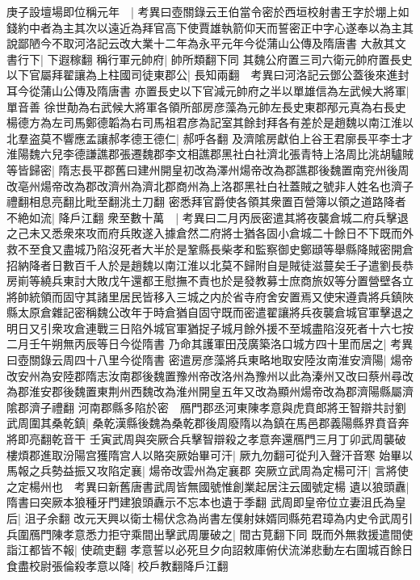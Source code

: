 庚子設壇場即位稱元年　|{
	考異曰壺關錄云王伯當令密於西垣校射書王字於堋上如錢約中者為主其次以遠近為拜官高下使賈雄執箭仰天而誓密正中字心遂奉以為主其說鄙陋今不取河洛記云改大業十二年為永平元年今從蒲山公傳及隋唐書}
大赦其文書行下|{
	下遐稼翻}
稱行軍元帥府|{
	帥所類翻下同}
其魏公府置三司六衛元帥府置長史以下官屬拜翟讓為上柱國司徒東郡公|{
	長知兩翻　考異曰河洛記云鄧公蓋後來進封耳今從蒲山公傳及隋唐書}
亦置長史以下官減元帥府之半以單雄信為左武候大將軍|{
	單音善}
徐世勣為右武候大將軍各領所部房彦藻為元帥左長史東郡邴元真為右長史楊德方為左司馬鄭德韜為右司馬祖君彦為記室其餘封拜各有差於是趙魏以南江淮以北羣盗莫不響應孟讓郝孝德王德仁|{
	郝呼各翻}
及濟隂房獻伯上谷王君廓長平李士才淮陽魏六兒李德謙譙郡張遷魏郡李文相譙郡黑社白社濟北張青特上洛周比洮胡驢賊等皆歸密|{
	隋志長平郡舊曰建州開皇初改為澤州煬帝改為郡譙郡後魏置南兖州後周改亳州煬帝改為郡改濟州為濟北郡商州為上洛郡黑社白社蓋賊之號非人姓名也濟子禮翻相息亮翻比毗至翻洮土刀翻}
密悉拜官爵使各領其衆置百營簿以領之道路降者不絶如流|{
	降戶江翻}
衆至數十萬　|{
	考異曰二月丙辰密遣其將夜襲倉城二府兵擊退之己未又悉衆來攻而府兵敗遂入據倉然二府將士猶各固小倉城二十餘日不下既而外救不至食又盡城乃陷沒死者大半於是鞏縣長柴孝和監察御史鄭頲等舉縣降賊密開倉招納降者日數百千人於是趙魏以南江淮以北莫不歸附自是賊徒滋蔓矣壬子遣劉長恭房崱等繞兵東討大敗戊午還都王慰撫不責也於是發教募士庶商旅奴等分置營壁各立將帥統領而固守其諸里居民皆移入三城之内於省寺府舍安置焉又使宋遵貴將兵鎮陜縣太原倉雜記密稱魏公改年于時倉猶自固守既而密遣翟讓將兵夜襲倉城官軍擊退之明日又引衆攻倉連戰三日陷外城官軍猶捉子城月餘外援不至城盡陷沒死者十六七按二月壬午朔無丙辰等日今從隋書}
乃命其護軍田茂廣築洛口城方四十里而居之|{
	考異曰壺關錄云周四十八里今從隋書}
密遣房彦藻將兵東略地取安陸汝南淮安濟陽|{
	煬帝改安州為安陸郡隋志汝南郡後魏置豫州帝改洛州為豫州以此為溱州又改曰蔡州尋改為郡淮安郡後魏置東荆州西魏改為淮州開皇五年又改為顯州煬帝改為郡濟陽縣屬濟隂郡濟子禮翻}
河南郡縣多陷於密　鴈門郡丞河東陳孝意與虎賁郎將王智辯共討劉武周圍其桑乾鎮|{
	桑乾漢縣後魏為桑乾郡後周廢隋以為鎮在馬邑郡義陽縣界賁音奔將即亮翻乾音干}
壬寅武周與突厥合兵擊智辯殺之孝意奔還鴈門三月丁卯武周襲破樓煩郡進取汾陽宫獲隋宫人以賂突厥始畢可汗|{
	厥九勿翻可從刋入聲汗音寒}
始畢以馬報之兵勢益振又攻陷定襄|{
	煬帝改雲州為定襄郡}
突厥立武周為定楊可汗|{
	言將使之定楊州也　考異曰新舊唐書武周皆無國號惟創業起居注云國號定楊}
遺以狼頭纛|{
	隋書曰突厥本狼種牙門建狼頭纛示不忘本也遺于季翻}
武周即皇帝位立妻沮氏為皇后|{
	沮子余翻}
改元天興以衛士楊伏念為尚書左僕射妹婿同縣苑君璋為内史令武周引兵圍鴈門陳孝意悉力拒守乘間出擊武周屢破之|{
	間古莧翻下同}
既而外無救援遣間使詣江都皆不報|{
	使疏吏翻}
孝意誓以必死旦夕向詔敕庫俯伏流涕悲動左右圍城百餘日食盡校尉張倫殺孝意以降|{
	校戶教翻降戶江翻}
